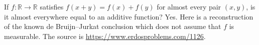 If \(f:\mathbb R\to\mathbb R\) satisfies \(f(x+y)=f(x)+f(y)\) for almost every pair \((x,y)\), is it almost everywhere equal to an additive function?
Yes. Here is a reconstruction of the known de Bruijn--Jurkat conclusion which does not assume that \(f\) is measurable. The source is \url{https://www.erdosproblems.com/1126}.
